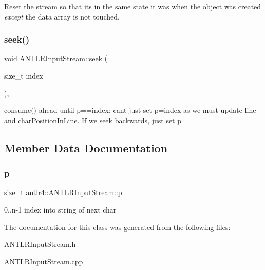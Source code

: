 Reset the stream so that it\textquotesingle{}s in the same state it was when the object was created {\itshape except} the data array is not touched. \mbox{\label{classantlr4_1_1ANTLRInputStream_ac46f2e88f0772bc65b537781a2341010}} 
\subsubsection{\texorpdfstring{seek()}{seek()}}
{\footnotesize\ttfamily void A\+N\+T\+L\+R\+Input\+Stream\+::seek (\begin{DoxyParamCaption}\item[{size\+\_\+t}]{index }\end{DoxyParamCaption})\hspace{0.3cm}{\ttfamily [override]}, {\ttfamily [virtual]}}



consume() ahead until p==index; can\textquotesingle{}t just set p=index as we must update line and char\+Position\+In\+Line. If we seek backwards, just set p 



\subsection{Member Data Documentation}
\mbox{\label{classantlr4_1_1ANTLRInputStream_a9499bf048c340771ad5f899a721c7f8d}} 
\subsubsection{\texorpdfstring{p}{p}}
{\footnotesize\ttfamily size\+\_\+t antlr4\+::\+A\+N\+T\+L\+R\+Input\+Stream\+::p\hspace{0.3cm}{\ttfamily [protected]}}



0..n-\/1 index into string of next char 



The documentation for this class was generated from the following files\+:\begin{DoxyCompactItemize}
\item 
A\+N\+T\+L\+R\+Input\+Stream.\+h\item 
A\+N\+T\+L\+R\+Input\+Stream.\+cpp\end{DoxyCompactItemize}
